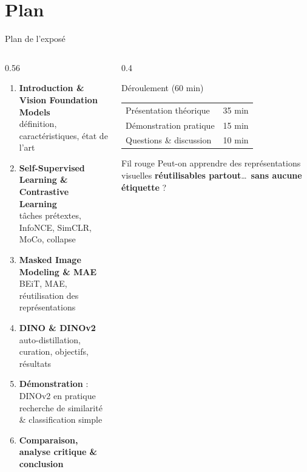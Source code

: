 \documentclass[aspectratio=169,10pt]{beamer}
\begin{document}
\section{Plan}
\begin{frame}{Plan de l'exposé}
  \begin{columns}[T]
    \begin{column}{0.56\textwidth}
      \begin{enumerate}
        \setlength{\itemsep}{2.2mm}
        \item \textbf{Introduction \& Vision Foundation Models}\\{\footnotesize\color{grisE}définition, caractéristiques, état de l'art}
        \item \textbf{Self-Supervised Learning \& Contrastive Learning}\\{\footnotesize\color{grisE}tâches prétextes, InfoNCE, SimCLR, MoCo, collapse}
        \item \textbf{Masked Image Modeling \& MAE}\\{\footnotesize\color{grisE}BEiT, MAE, réutilisation des représentations}
        \item \textbf{DINO \& DINOv2}\\{\footnotesize\color{grisE}auto-distillation, curation, objectifs, résultats}
        \item \textbf{Démonstration} : DINOv2 en pratique\\{\footnotesize\color{grisE}recherche de similarité \& classification simple}
        \item \textbf{Comparaison, analyse critique \& conclusion}
      \end{enumerate}
    \end{column}
    \begin{column}{0.4\textwidth}
      \begin{block}{Déroulement (60 min)}
        \small
        \begin{tabular}{@{}l r@{}}
          Présentation théorique & 35 min\\
          Démonstration pratique & 15 min\\
          Questions \& discussion & 10 min\\
        \end{tabular}
      \end{block}
      \vspace{2mm}
      \begin{exampleblock}{Fil rouge}
        \small Peut-on apprendre des représentations visuelles \textbf{réutilisables partout}\ldots\ \textbf{sans aucune étiquette} ?
      \end{exampleblock}
    \end{column}
  \end{columns}
\end{frame}
\end{document}

